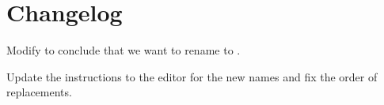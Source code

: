 \section{Changelog}
\begin{revision}
\item Modify  to conclude that we want to rename to \stdsimd{}.
\item Update the instructions to the editor for the new names and fix the order of replacements.
\end{revision}
